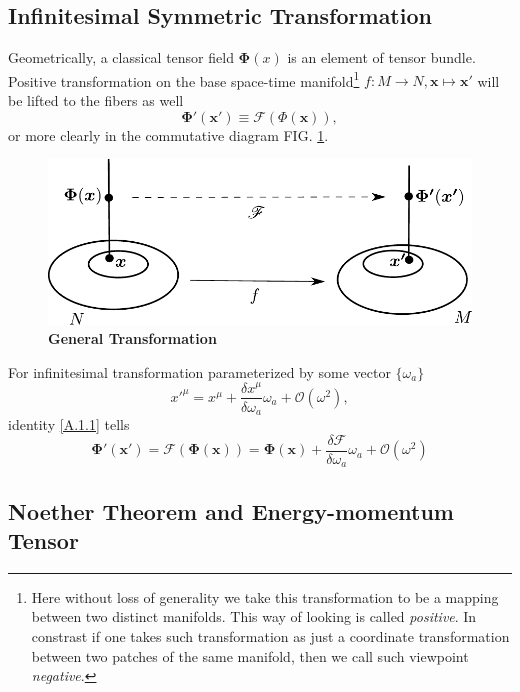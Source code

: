 \documentclass[10pt,nofootinbib]{revtex4}
\begin{document}
	\subsection{Infinitesimal Symmetric Transformation}
		Geometrically, a classical tensor field $\bm{\Phi}(x)$ is an element of tensor bundle. Positive transformation on the base space-time manifold\footnote{Here without loss of generality we take this transformation to be a mapping between two distinct manifolds. This way of looking is called \emph{positive}. In constrast if one takes such transformation as just a coordinate transformation between two patches of the same manifold, then we call such viewpoint \emph{negative}.} $f:M\rightarrow N, \bm{x}\mapsto \bm{x'}$ will be lifted to the fibers as well
		\begin{equation}\label{A.1.1}
			\bm{\Phi'}(\bm{x'})\equiv \mathscr{F}(\Phi(\bm{x})),
		\end{equation}
		or more clearly in the commutative diagram FIG. \ref{fig: transformation}.\par
		\begin{figure}[!htp]
			\centering
			\includegraphics[scale=0.8]{transformation.pdf}
			\caption{{\bf General Transformation}}
			\label{fig: transformation}
		\end{figure}
		For infinitesimal transformation parameterized by some vector $\{\omega_a\}$
		\begin{equation*}
			x'^\mu=x^\mu+\dfrac{\delta x^\mu}{\delta\omega_a}\omega_a+\mathcal{O}(\omega^2),
		\end{equation*}
		identity \eqref{A.1.1} tells
		\begin{equation}\label{A.1.2}
			\bm{\Phi'}(\bm{x'})=\mathscr{F}(\bm{\Phi}(\bm{x}))=\bm{\Phi}(\bm{x})+\dfrac{\delta\mathscr{F}}{\delta\omega_a}\omega_a+\mathcal{O}(\omega^2)
		\end{equation}
		
	\subsection{Noether Theorem and Energy-momentum Tensor}

\end{document}

